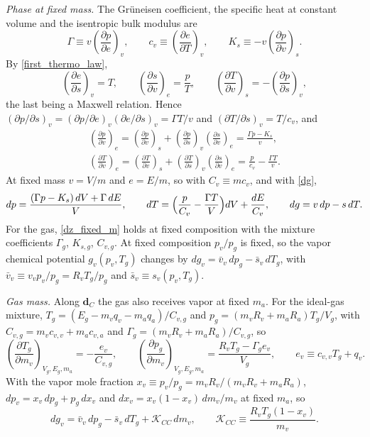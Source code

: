 \emph{Phase at fixed mass.} The Gr\"uneisen coefficient, the specific heat at constant volume and the isentropic bulk modulus are
\begin{equation}
\Gamma\equiv v\left(\frac{\partial p}{\partial e}\right)_v,\qquad c_v\equiv\left(\frac{\partial e}{\partial T}\right)_v,\qquad K_s\equiv-v\left(\frac{\partial p}{\partial v}\right)_s .
\end{equation}
By \eqref{first_thermo_law},
\begin{equation}
\left(\frac{\partial e}{\partial s}\right)_v=T,\qquad \left(\frac{\partial s}{\partial v}\right)_e=\frac{p}{T},\qquad \left(\frac{\partial T}{\partial v}\right)_s=-\left(\frac{\partial p}{\partial s}\right)_v,
\end{equation}
the last being a Maxwell relation. Hence $(\partial p/\partial s)_v=(\partial p/\partial e)_v(\partial e/\partial s)_v=\Gamma T/v$ and $(\partial T/\partial s)_v=T/c_v$, and
\begin{equation}
\begin{gathered}
\left(\frac{\partial p}{\partial v}\right)_e=\left(\frac{\partial p}{\partial v}\right)_s+\left(\frac{\partial p}{\partial s}\right)_v\left(\frac{\partial s}{\partial v}\right)_e=\frac{\Gamma p-K_s}{v},\\
\left(\frac{\partial T}{\partial v}\right)_e=\left(\frac{\partial T}{\partial v}\right)_s+\left(\frac{\partial T}{\partial s}\right)_v\left(\frac{\partial s}{\partial v}\right)_e=\frac{p}{c_v}-\frac{\Gamma T}{v}.
\end{gathered}
\end{equation}
At fixed mass $v=V/m$ and $e=E/m$, so with $C_v\equiv mc_v$, and with \eqref{dg},
\begin{equation}\label{dz_fixed_m}
dp=\frac{(\Gamma p-K_s)\,dV+\Gamma\,dE}{V},\qquad dT=\Bigl(\frac{p}{C_v}-\frac{\Gamma T}{V}\Bigr)dV+\frac{dE}{C_v},\qquad dg=v\,dp-s\,dT .
\end{equation}
For the gas, \eqref{dz_fixed_m} holds at fixed composition with the mixture coefficients $\Gamma_g$, $K_{s,g}$, $C_{v,g}$. At fixed composition $p_v/p_g$ is fixed, so the vapor chemical potential $g_v(p_v,T_g)$ changes by $dg_v=\bar v_v\,dp_g-\bar s_v\,dT_g$, with $\bar v_v\equiv v_vp_v/p_g=R_vT_g/p_g$ and $\bar s_v\equiv s_v(p_v,T_g)$.

\emph{Gas mass.} Along $\boldsymbol{d}_C$ the gas also receives vapor at fixed $m_a$. For the ideal-gas mixture, $T_g=(E_g-m_vq_v-m_aq_a)/C_{v,g}$ and $p_g=(m_vR_v+m_aR_a)T_g/V_g$, with $C_{v,g}=m_vc_{v,v}+m_ac_{v,a}$ and $\Gamma_g=(m_vR_v+m_aR_a)/C_{v,g}$, so
\begin{equation}\label{dz_mass_g}
\left(\frac{\partial T_g}{\partial m_v}\right)_{V_g,E_g,m_a}=-\frac{e_v}{C_{v,g}},\qquad
\left(\frac{\partial p_g}{\partial m_v}\right)_{V_g,E_g,m_a}=\frac{R_vT_g-\Gamma_ge_v}{V_g},\qquad e_v\equiv c_{v,v}T_g+q_v .
\end{equation}
With the vapor mole fraction $x_v\equiv p_v/p_g=m_vR_v/(m_vR_v+m_aR_a)$, $dp_v=x_v\,dp_g+p_g\,dx_v$ and $dx_v=x_v(1-x_v)\,dm_v/m_v$ at fixed $m_a$, so
\begin{equation}\label{dgv}
dg_v=\bar v_v\,dp_g-\bar s_v\,dT_g+\mathcal{K}_{CC}\,dm_v,\qquad \mathcal{K}_{CC}\equiv\frac{R_vT_g(1-x_v)}{m_v}.
\end{equation}

